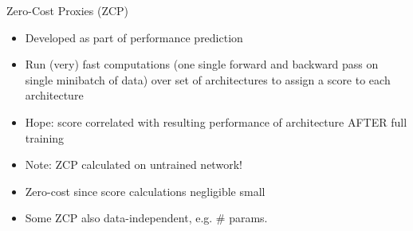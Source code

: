 \documentclass[main]{subfiles}
\begin{document}


\begin{frame}{Zero-Cost Proxies (ZCP)}
    \begin{itemize}
        \item Developed as part of performance prediction 
        \item Run (very) fast computations (one single forward and backward pass on single minibatch of data) over set of architectures to assign a score to each architecture
        \pause
        \item Hope: score correlated with resulting performance of architecture AFTER full training
        \item Note: ZCP calculated on untrained network! 
        \item Zero-cost since score calculations negligible small
        \item Some ZCP also data-independent, e.g. \# params. 
    \end{itemize}
\end{frame}
\end{document}
